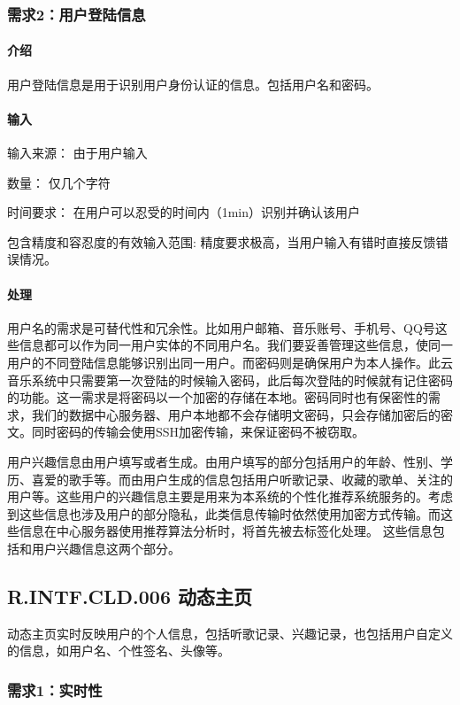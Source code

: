 \subsubsection{需求2：用户登陆信息}
\paragraph{介绍}
用户登陆信息是用于识别用户身份认证的信息。包括用户名和密码。

\paragraph{输入}
输入来源：
由于用户输入

数量：
仅几个字符

时间要求：
在用户可以忍受的时间内（1min）识别并确认该用户

包含精度和容忍度的有效输入范围:
精度要求极高，当用户输入有错时直接反馈错误情况。

\paragraph{处理}
用户名的需求是可替代性和冗余性。比如用户邮箱、音乐账号、手机号、QQ号这些信息都可以作为同一用户实体的不同用户名。我们要妥善管理这些信息，使同一用户的不同登陆信息能够识别出同一用户。而密码则是确保用户为本人操作。此云音乐系统中只需要第一次登陆的时候输入密码，此后每次登陆的时候就有记住密码的功能。这一需求是将密码以一个加密的存储在本地。密码同时也有保密性的需求，我们的数据中心服务器、用户本地都不会存储明文密码，只会存储加密后的密文。同时密码的传输会使用SSH加密传输，来保证密码不被窃取。

用户兴趣信息由用户填写或者生成。由用户填写的部分包括用户的年龄、性别、学历、喜爱的歌手等。而由用户生成的信息包括用户听歌记录、收藏的歌单、关注的用户等。这些用户的兴趣信息主要是用来为本系统的个性化推荐系统服务的。考虑到这些信息也涉及用户的部分隐私，此类信息传输时依然使用加密方式传输。而这些信息在中心服务器使用推荐算法分析时，将首先被去标签化处理。
这些信息包括和用户兴趣信息这两个部分。

\subsection{R.INTF.CLD.006 动态主页}
动态主页实时反映用户的个人信息，包括听歌记录、兴趣记录，也包括用户自定义的信息，如用户名、个性签名、头像等。
\subsubsection{需求1：实时性}
